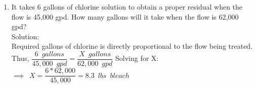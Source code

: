 \begin{enumerate}
\item It takes 6 gallons of chlorine solution to obtain a proper residual when the flow is 45,000 gpd. How many gallons will it take when the flow is 62,000 gpd?\\
\vspace{0.2cm}
Solution:\\
\vspace{0.2cm}
Required gallons of chlorine is directly proportional to the flow being treated.\\
\vspace{0.2cm}
Thus, $\dfrac{6 \enspace gallons}{45,000 \enspace gpd }=\dfrac{X \enspace gallons}{62,000 \enspace gpd}$
\vspace{0.2cm}
Solving for X:\\
\vspace{0.2cm}
$\implies \enspace X=\dfrac{6*62,000}{45,000}=\boxed{8.3 \enspace lbs \enspace bleach}$
\vspace{0.2cm}


\end{enumerate}

